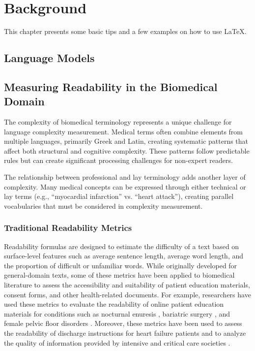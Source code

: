 \chapter{Background}
\label{c2}

This chapter presents some basic tips and a few examples on how to use \LaTeX.


\section{Language Models}
\label{c2:s:language-models}

\section{Measuring Readability in the Biomedical Domain}
\label{c2:s:linguistic-complexity}

The complexity of biomedical terminology represents a unique challenge for language complexity measurement. 
Medical terms often combine elements from multiple languages, primarily Greek and Latin, creating systematic patterns that affect both structural and cognitive complexity. 
These patterns follow predictable rules but can create significant processing challenges for non-expert readers.

The relationship between professional and lay terminology adds another layer of complexity. 
Many medical concepts can be expressed through either technical or lay terms (e.g., ``myocardial infarction'' vs. ``heart attack''), creating parallel vocabularies that must be considered in complexity measurement. 

\subsection{Traditional Readability Metrics}

Readability formulas are designed to estimate the difficulty of a text based on surface-level features such as average sentence length, average word length, and the proportion of difficult or unfamiliar words. While originally developed for general-domain texts, some of these metrics have been applied to biomedical literature to assess the accessibility and suitability of patient education materials, consent forms, and other health-related documents. For example, researchers have used these metrics to evaluate the readability of online patient education materials for conditions such as nocturnal enuresis \cite{Fung2024-uh}, bariatric surgery \cite{Lucy2023-zi}, and female pelvic floor disorders \cite{Varli2023-ma}. Moreover, these metrics have been used to assess the readability of discharge instructions for heart failure patients \cite{Tuan2023-wc} and to analyze the quality of information provided by intensive and critical care societies \cite{Hanci2024-wv}.


